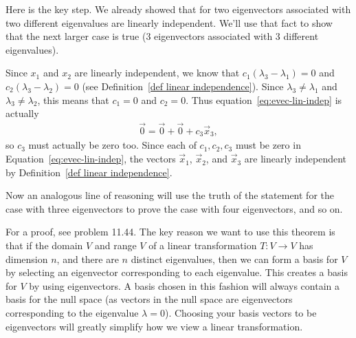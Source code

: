 {Here is the key step.  We already showed that for two eigenvectors associated with two different eigenvalues are linearly independent.  We'll use that fact to show that the next larger case is true (3 eigenvectors associated with 3 different eigenvalues).

Since $x_1$ and $x_2$ are linearly independent, we know that $c_1(\lambda_3-\lambda_1)=0$ and $c_2(\lambda_3-\lambda_2)=0$ (see Definition~\ref{def linear independence}).  Since $\lambda_3\neq \lambda_1$ and $\lambda_3\neq \lambda_2$, this means that $c_1=0$ and $c_2=0$.  Thus equation~\eqref{eq:evec-lin-indep} is actually
\begin{align*}
  \vec 0=\vec 0 + \vec 0+c_3\vec x_3,
\end{align*}
so $c_3$ must actually be zero too.  Since each of $c_1,c_2,c_3$ must be zero in Equation~\eqref{eq:evec-lin-indep}, the vectors $\vec x_1$, $\vec x_2$, and $\vec x_3$ are linearly independent by Definition~\ref{def linear independence}.

Now an analogous line of reasoning will use the truth of the statement for the case with three eigenvectors to prove the case with four eigenvectors, and so on.
}
For a proof, see problem 11.44. The key reason we want to use this theorem is that if the domain $V$ and range $V$ of a linear transformation $T\colon V\to V$ has dimension $n$, and there are $n$ distinct eigenvalues, then we can form a basis for $V$ by selecting an eigenvector corresponding to each eigenvalue. This creates a basis for $V$ by using eigenvectors. A basis chosen in this fashion will always contain a basis for the null space (as vectors in the null space are eigenvectors corresponding to the eigenvalue $\lambda = 0$). Choosing your basis vectors to be eigenvectors will greatly simplify how we view a linear transformation.


